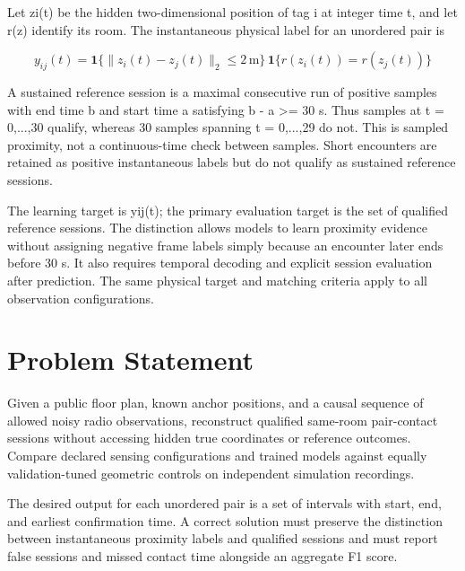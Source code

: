 \documentclass[12pt,a4paper]{report}
\begin{document}
Let zi(t) be the hidden two-dimensional position of tag i at integer time t, and let r(z) identify its room. The instantaneous physical label for an unordered pair is

\begin{equation}
y_{ij}(t)=\mathbf{1}\{\lVert z_i(t)-z_j(t)\rVert_2\leq 2\,\mathrm{m}\}\,\mathbf{1}\{r(z_i(t))=r(z_j(t))\}
\label{eq:source1}
\end{equation}

A sustained reference session is a maximal consecutive run of positive samples with end time b and start time a satisfying b - a >= 30 s. Thus samples at t = 0,...,30 qualify, whereas 30 samples spanning t = 0,...,29 do not. This is sampled proximity, not a continuous-time check between samples. Short encounters are retained as positive instantaneous labels but do not qualify as sustained reference sessions.

The learning target is yij(t); the primary evaluation target is the set of qualified reference sessions. The distinction allows models to learn proximity evidence without assigning negative frame labels simply because an encounter later ends before 30 s. It also requires temporal decoding and explicit session evaluation after prediction. The same physical target and matching criteria apply to all observation configurations.

\section{Problem Statement}
Given a public floor plan, known anchor positions, and a causal sequence of allowed noisy radio observations, reconstruct qualified same-room pair-contact sessions without accessing hidden true coordinates or reference outcomes. Compare declared sensing configurations and trained models against equally validation-tuned geometric controls on independent simulation recordings.

The desired output for each unordered pair is a set of intervals with start, end, and earliest confirmation time. A correct solution must preserve the distinction between instantaneous proximity labels and qualified sessions and must report false sessions and missed contact time alongside an aggregate F1 score.
\end{document}
